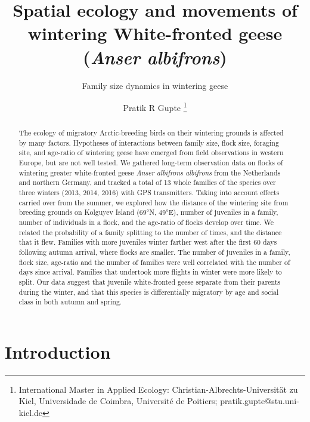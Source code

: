 \documentclass[10pt,twocolumn]{paper}
\title{Spatial ecology and movements of wintering White-fronted geese
(\emph{Anser albifrons})}
\subtitle{Family size dynamics in wintering geese}
\author{Pratik R Gupte \thanks{International Master in Applied Ecology: Christian-Albrechts-Universit\"{a}t zu Kiel, Universidade de Coimbra, Universit\'{e} de Poitiers; pratik.gupte@stu.uni-kiel.de}}
\date{}
\begin{document}
\maketitle
\begin{abstract}
The ecology of migratory Arctic-breeding birds on their wintering
grounds is affected by many factors. Hypotheses of interactions between
family size, flock size, foraging site, and age-ratio of wintering geese
have emerged from field observations in western Europe, but are not well
tested. We gathered long-term observation data on flocks of wintering
greater white-fronted geese \emph{Anser albifrons albifrons} from the
Netherlands and northern Germany, and tracked a total of 13 whole
families of the species over three winters (2013, 2014, 2016) with GPS
transmitters. Taking into account effects carried over from the summer,
we explored how the distance of the wintering site from breeding grounds
on Kolguyev Island (69°N, 49°E), number of juveniles in a family, number
of individuals in a flock, and the age-ratio of flocks develop over
time. We related the probability of a family splitting to the number of
times, and the distance that it flew. Families with more juveniles
winter farther west after the first 60 days following autumn arrival,
where flocks are smaller. The number of juveniles in a family, flock
size, age-ratio and the number of families were well correlated with the
number of days since arrival. Families that undertook more flights in
winter were more likely to split. Our data suggest that juvenile
white-fronted geese separate from their parents during the winter, and
that this species is differentially migratory by age and social class in
both autumn and spring.
\end{abstract}

\renewcommand\dblfloatpagefraction{.95} %
\renewcommand\dbltopfraction{.95} %
\renewcommand\bottomfraction{.9}
\renewcommand\textfraction{.1}

\setcounter{totalnumber}{50} \setcounter{topnumber}{50}
\setcounter{bottomnumber}{10} \setlength{\textfloatsep}{5pt}
\setlength{\floatsep}{5pt}

\section{Introduction}\label{introduction}
\end{document}

